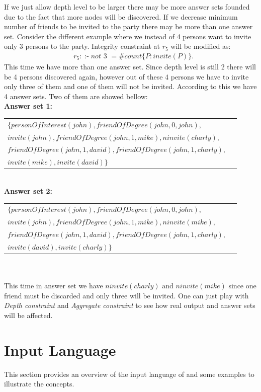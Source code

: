 \documentclass[14pt,a4paper, titlepage]{article}
\DeclareMathOperator{\leftimpl}{:-}
\begin{document}
If we just allow depth level to be larger there may be more answer sets founded due to the fact that more nodes will be discovered. If we decrease minimum number of friends to be invited to the party there may be more than one answer set. Consider the different example where we instead of 4 persons want to invite only 3 persons to the party. Integrity constraint at $r_5$ will be modified as:
\begin{align*}
& r_5 \colon \leftimpl \mathit{not} \text{ 3 } = \mathit{\#count} \{ P : \mathit{invite(P)} \}.
\end{align*} 
 This time we have more than one answer set. Since depth level is still 2 there will be 4 persons discovered again, however out of these 4 persons we have to invite only three of them and one of them will not be invited. According to this we have 4 answer sets. Two of them are showed bellow:\\
\textbf{Answer set 1:}\\
\begin{tabular}{ l r }
   $\mathit{\{personOfInterest(john), friendOfDegree(john,0,john),}$& \\
   $\mathit{invite(john), friendOfDegree(john,1,mike), \mathit{ninvite(charly)},}$& \\
   $\mathit{friendOfDegree(john,1,david), friendOfDegree(john,1,charly),}$ & \\
   $\mathit{invite(mike),invite(david)\}}$
 \end{tabular}
\\ \textbf{Answer set 2:}\\
 \begin{tabular}{ l r }
   $\mathit{\{personOfInterest(john), friendOfDegree(john,0,john),}$& \\
   $\mathit{invite(john), friendOfDegree(john,1,mike), \mathit{ninvite(mike)},}$& \\
   $\mathit{friendOfDegree(john,1,david), friendOfDegree(john,1,charly),}$ & \\
   $\mathit{invite(david),invite(charly)\}}$
 \end{tabular}
\\ \\ This time in answer set we have $\mathit{ninvite(charly)} \text{ and } \mathit{ninvite(mike)}$ since one friend must be discarded and only three will be invited. One can just play with \emph{Depth constraint} and \emph{Aggregate constraint} to see how real output and answer sets will be affected.    


\section{Input Language}%
This section provides an overview of the input language of \dlvhex{} and some examples to illustrate the concepts. 
\end{document}
